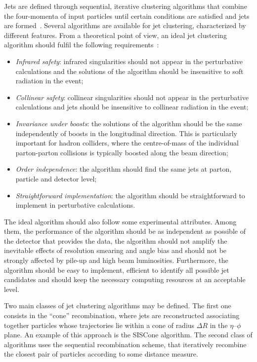 Jets are defined through sequential, iterative clustering algorithms that combine the four-momenta of input particles until certain conditions are satisfied and jets are formed~\cite{Salam:2009jx}. Several algorithms are available for jet clustering, characterized by different features. From a theoretical point of view, an ideal jet clustering algorithm should fulfil the following requirements~\cite{Blazey:2000qt}:
\begin{itemize}
\item \emph{Infrared safety}: infrared singularities should not appear in the perturbative calculations and the solutions of the algorithm should be insensitive to soft radiation in the event;
\item \emph{Collinear safety}: collinear singularities should not appear in the perturbative calculations and jets should be insensitive to collinear radiation in the event;
\item \emph{Invariance under boosts}: the solutions of the algorithm should be the same independently of boosts in the longitudinal direction. This is particularly important for hadron colliders, where the centre-of-mass of the individual parton-parton collisions is typically boosted along the beam direction;
\item \emph{Order independence}: the algorithm should find the same jets at parton, particle and detector level;
\item \emph{Straightforward implementation}: the algorithm should be straightforward to implement in perturbative calculations.
\end{itemize}
The ideal algorithm should also follow some experimental attributes. Among them, the performance of the algorithm should be as independent as possible of the detector that provides the data, the algorithm should not amplify the inevitable effects of resolution smearing and angle bias and should not be strongly affected by pile-up and high beam luminosities. Furthermore, the algorithm should be easy to implement, efficient to identify all possible jet candidates and should keep the necessary computing resources at an acceptable level.

Two main classes of jet clustering algorithms may be defined. The first one consists in the ``cone'' recombination, where jets are reconstructed associating together particles whose trajectories lie within a cone of radius $\Delta R$ in the $\eta$--$\phi$ plane. An example of this approach is the SISCone algorithm. The second class of algorithms uses the sequential recombination scheme, that iteratively recombine the closest pair of particles according to some distance measure.

